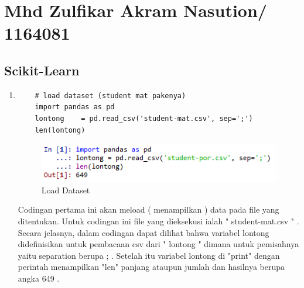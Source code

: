 \section{Mhd Zulfikar Akram Nasution/ 1164081}
\subsection{Scikit-Learn}

\begin{enumerate}
\item
\begin{verbatim}
	# load dataset (student mat pakenya)
	import pandas as pd
	lontong    = pd.read_csv('student-mat.csv', sep=';')
	len(lontong)
\end{verbatim}
\begin{figure}[ht]
\centering
\includegraphics[scale=0.9]{figures/lontong/1.png}
\caption{Load Dataset}
\end{figure}
\par
	Codingan pertama ini akan meload ( menampilkan ) data pada file yang ditentukan. Untuk codingan ini file yang dieksekusi ialah " student-mat.csv " . Secara jelasnya, dalam codingan dapat dilihat bahwa variabel lontong didefinisikan untuk pembacaan csv dari " lontong " dimana untuk pemisahnya yaitu separation berupa ; . Setelah itu variabel lontong di "print" dengan perintah menampilkan "len" panjang ataupun jumlah dan hasilnya berupa angka 649 . 


\end{enumerate}

